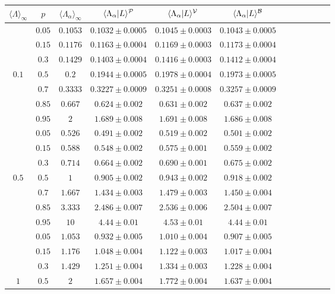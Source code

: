 \documentclass[final,authoryear,5p,times,twocolumn]{elsarticle}
\begin{document}
\begin{table*}
\begin{center}
\begin{tabular}{cccccccccccc}
\toprule
${\langle \Lambda \rangle}_{\infty}$ &  $p$ & ${\langle \Lambda_{\alpha} \rangle}_{\infty}$ & $\langle \Lambda_{\alpha} | L \rangle ^{\cal P}$ & $\langle \Lambda_{\alpha} | L \rangle ^{\cal V}$ & $\langle \Lambda_{\alpha} | L \rangle ^{\cal B}$\\
 \midrule
& $0.05$ & $0.1053$ & $0.1032 \pm 0.0005$ & $0.1045 \pm 0.0003$ & $0.1043 \pm 0.0005$\\
& $0.15$ & $0.1176$ & $0.1163 \pm 0.0004$ & $0.1169 \pm 0.0003$ & $0.1173 \pm 0.0004$ \\
& $0.3$ & $0.1429$ & $0.1403 \pm 0.0004$ & $0.1416 \pm 0.0003$ & $0.1412 \pm 0.0004$\\
$0.1$ & $0.5$ & $0.2$ & $0.1944 \pm 0.0005$ & $0.1978 \pm 0.0004$ & $0.1973 \pm 0.0005$\\
& $0.7$ & $0.3333$ & $0.3227 \pm 0.0009$ & $0.3251 \pm 0.0008$ & $0.3257 \pm 0.0009$ \\
& $0.85$ & $0.667$ & $0.624 \pm 0.002$ & $0.631 \pm 0.002$ & $0.637 \pm 0.002$ \\
& $0.95$ & $2$ & $1.689 \pm 0.008$ & $1.691 \pm 0.008$ & $1.686 \pm 0.008$\\
\midrule
& $0.05$ & $0.526$ & $0.491 \pm 0.002$ & $0.519 \pm 0.002$ & $0.501 \pm 0.002$ \\
& $0.15$ & $0.588$ & $0.548 \pm 0.002$ & $0.575 \pm 0.001$ & $0.559 \pm 0.002$ \\
& $0.3$ & $0.714$ & $0.664 \pm 0.002$ & $0.690 \pm 0.001$ & $0.675 \pm 0.002$ \\
$0.5$ & $0.5$ & $1$ & $0.905 \pm 0.002$ & $0.943 \pm 0.002$ & $0.918 \pm 0.002$ \\
& $0.7$ & $1.667$ & $1.434 \pm 0.003$ & $1.479 \pm 0.003$ & $1.450 \pm 0.004$ \\
& $0.85$ & $3.333$ & $2.486 \pm 0.007$ & $2.536 \pm 0.006$ & $2.504 \pm 0.007$ \\
& $0.95$ & $10$ & $4.44 \pm 0.01$ & $4.53 \pm 0.01$ & $4.44 \pm 0.01$ \\
\midrule
& $0.05$ & $1.053$ & $0.932 \pm 0.005$ & $1.010 \pm 0.004$ & $0.907 \pm 0.005$\\
& $0.15$ & $1.176$ & $1.048 \pm 0.004$ & $1.122 \pm 0.003$ & $1.017 \pm 0.004$\\
& $0.3$  & $1.429$ & $1.251 \pm 0.004$ & $1.334 \pm 0.003$ & $1.228 \pm 0.004$\\
$1$ & $0.5$ & $2$ & $1.657 \pm 0.004$ & $1.772 \pm 0.004$ & $1.637 \pm 0.004$\\

\end{tabular}
\end{center}
\end{table*}
\end{document}
